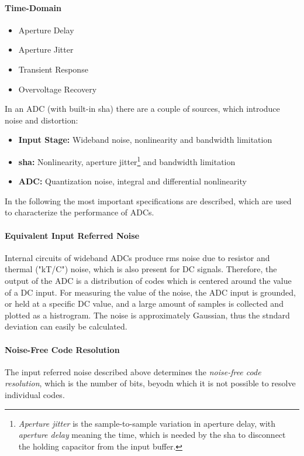 \paragraph{Time-Domain}
\begin{itemize}
	\item Aperture Delay
	\item Aperture Jitter
	\item Transient Response
	\item Overvoltage Recovery
\end{itemize}


In an ADC (with built-in \gls{sha}) there are a couple of sources, which introduce noise and distortion:
\begin{itemize}
	\item \textbf{Input Stage:} Wideband noise, nonlinearity and bandwidth limitation
	\item \textbf{\gls{sha}:} Nonlinearity, aperture jitter\footnote{\textit{Aperture jitter} is the sample-to-sample variation in aperture delay, with \textit{aperture delay} meaning the time, which is needed by the \gls{sha} to disconnect the holding capacitor from the input buffer.} and bandwidth limitation
	\item \textbf{ADC:} Quantization noise, integral and differential nonlinearity
\end{itemize}
In the following the most important specifications are described, which are used to characterize the performance of ADCs.



\paragraph{Equivalent Input Referred Noise}
Internal circuits of wideband ADCs produce rms noise due to resistor and thermal ("kT/C") noise, which is also present for DC signals. Therefore, the output of the ADC is a distribution of codes which is centered around the value of a DC input. For measuring the value of the noise, the ADC input is grounded, or held at a specific DC value, and a large amount of samples is collected and plotted as a histrogram. The noise is approximately Gaussian, thus the stndard deviation can easily be calculated.

\paragraph{Noise-Free Code Resolution}
The input referred noise described above determines the \textit{noise-free code resolution}, which is the number of bits, beyodn which it is not possible to resolve individual codes.
\cite{walt}


